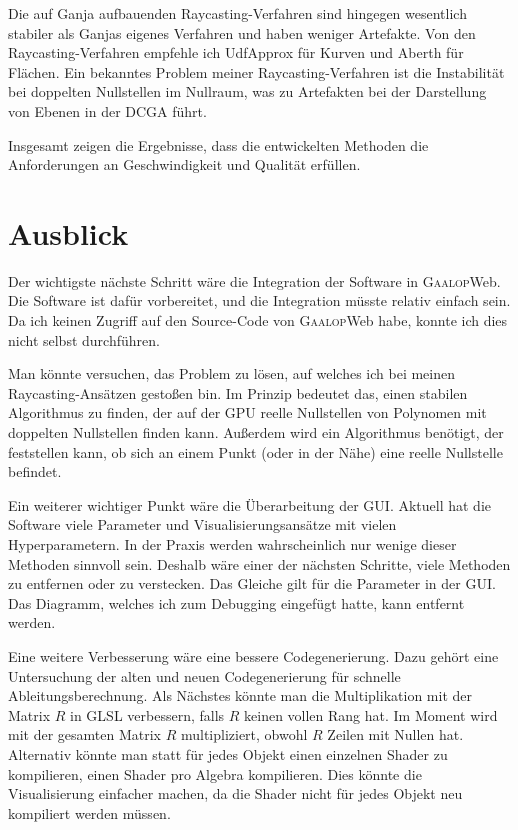 \documentclass[
	ngerman,%
	accentcolor=9c,%
	ruledheaders=section,%
	class=report,%
	thesis={type=bachelor},%
	fontsize=11pt,%
	parskip=half-,%
	custommargins=true,%
	marginpar=false,%
]{tudapub}
\begin{document}
Die auf Ganja aufbauenden Raycasting-Verfahren sind hingegen wesentlich stabiler als Ganjas eigenes Verfahren und haben weniger Artefakte.
Von den Raycasting-Verfahren empfehle ich UdfApprox für Kurven und Aberth für Flächen. 
Ein bekanntes Problem meiner Raycasting-Verfahren ist die Instabilität bei doppelten Nullstellen im Nullraum, was zu Artefakten bei der Darstellung von Ebenen in der DCGA führt.

Insgesamt zeigen die Ergebnisse, dass die entwickelten Methoden die Anforderungen an Geschwindigkeit und Qualität erfüllen.

\chapter{Ausblick}
Der wichtigste nächste Schritt wäre die Integration der Software in \textsc{Gaalop}Web. Die Software ist dafür vorbereitet, und die Integration müsste relativ einfach sein. Da ich keinen Zugriff auf den Source-Code von \textsc{Gaalop}Web habe, konnte ich dies nicht selbst durchführen.

Man könnte versuchen, das Problem zu lösen, auf welches ich bei meinen Raycasting-Ansätzen gestoßen bin. Im Prinzip bedeutet das, einen stabilen Algorithmus zu finden, der auf der GPU reelle Nullstellen von Polynomen mit doppelten Nullstellen finden kann. Außerdem wird ein Algorithmus benötigt, der feststellen kann, ob sich an einem Punkt (oder in der Nähe) eine reelle Nullstelle befindet.

Ein weiterer wichtiger Punkt wäre die Überarbeitung der GUI.
Aktuell hat die Software viele Parameter und Visualisierungsansätze mit vielen Hyperparametern. In der Praxis werden wahrscheinlich nur wenige dieser Methoden sinnvoll sein. Deshalb wäre einer der nächsten Schritte, viele Methoden zu entfernen oder zu verstecken. Das Gleiche gilt für die Parameter in der GUI. Das Diagramm, welches ich zum Debugging eingefügt hatte, kann entfernt werden.

Eine weitere Verbesserung wäre eine bessere Codegenerierung. Dazu gehört eine Untersuchung der alten und neuen Codegenerierung für schnelle Ableitungsberechnung. Als Nächstes könnte man die Multiplikation mit der Matrix \(R\) in GLSL verbessern, falls \(R\) keinen vollen Rang hat. Im Moment wird mit der gesamten Matrix \(R\) multipliziert, obwohl \(R\) Zeilen mit Nullen hat. Alternativ könnte man statt für jedes Objekt einen einzelnen Shader zu kompilieren, einen Shader pro Algebra kompilieren. Dies könnte die Visualisierung einfacher machen, da die Shader nicht für jedes Objekt neu kompiliert werden müssen.


\printbibliography
\end{document}
